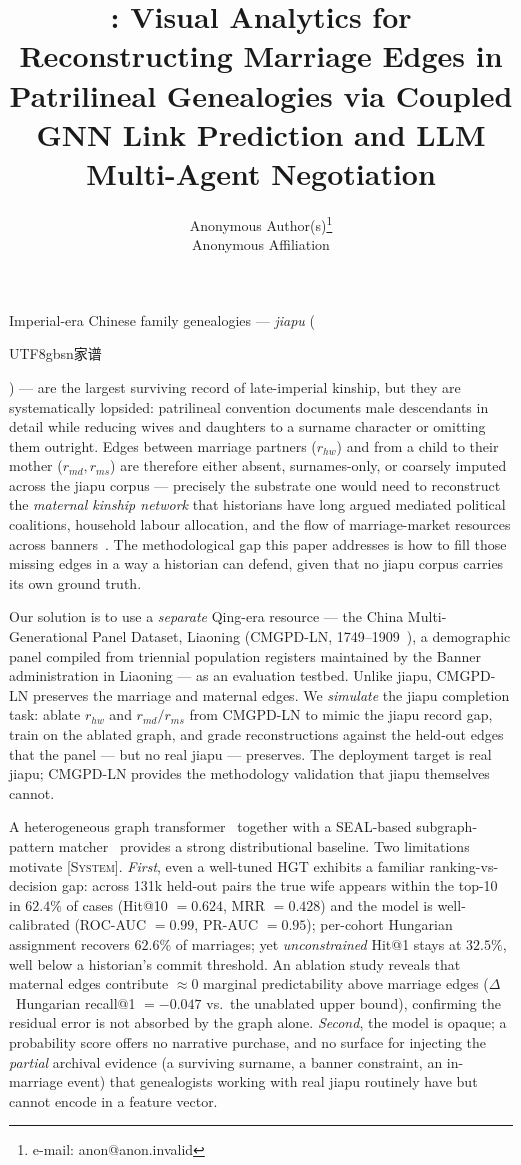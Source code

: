 \documentclass[review]{vgtc}                  %
\title{\system: Visual Analytics for Reconstructing Marriage Edges in
Patrilineal Genealogies via Coupled GNN Link Prediction and LLM
Multi-Agent Negotiation}
\author{Anonymous Author(s)\thanks{e-mail: anon@anon.invalid}\\
        \scriptsize Anonymous Affiliation}
\newcommand{\system}{\textsc{[System]}\xspace}
\begin{document}
\maketitle

Imperial-era Chinese family genealogies --- \emph{jiapu}
(\begin{CJK*}{UTF8}{gbsn}家谱\end{CJK*}) --- are the largest surviving
record of late-imperial kinship, but they are systematically lopsided:
patrilineal convention documents male descendants in detail while
reducing wives and daughters to a surname character or omitting them
outright. Edges between marriage partners ($r_{hw}$) and from a child
to their mother ($r_{md}, r_{ms}$) are therefore either absent,
surnames-only, or coarsely imputed across the jiapu corpus --- precisely
the substrate one would need to reconstruct the \emph{maternal kinship
network} that historians have long argued mediated political coalitions,
household labour allocation, and the flow of marriage-market resources
across banners~\cite{wang2007muxia, mann2002precious}.
The methodological gap this paper addresses is how to fill those
missing edges in a way a historian can defend, given that no jiapu
corpus carries its own ground truth.

Our solution is to use a \emph{separate} Qing-era resource --- the
China Multi-Generational Panel Dataset, Liaoning (CMGPD-LN,
1749--1909~\cite{cmgpd-ln-2010}), a demographic panel compiled from
triennial population registers maintained by the Banner administration
in Liaoning --- as an evaluation testbed. Unlike jiapu, CMGPD-LN
preserves the marriage and maternal edges. We \emph{simulate} the
jiapu completion task: ablate $r_{hw}$ and $r_{md}/r_{ms}$ from
CMGPD-LN to mimic the jiapu record gap, train on the ablated graph,
and grade reconstructions against the held-out edges that the panel
--- but no real jiapu --- preserves. The deployment target is real
jiapu; CMGPD-LN provides the methodology validation that jiapu
themselves cannot.

A heterogeneous graph transformer~\cite{hu2020hgt} together with a
SEAL-based subgraph-pattern matcher~\cite{zhang2018seal} provides a
strong distributional baseline. Two limitations motivate \system.
\emph{First}, even a well-tuned HGT exhibits a familiar
ranking-vs-decision gap: across 131k held-out pairs the true wife
appears within the top-10 in $62.4\%$ of cases
(Hit@10 $= 0.624$, MRR $= 0.428$) and the model is well-calibrated
(ROC-AUC $= 0.99$, PR-AUC $= 0.95$); per-cohort Hungarian assignment
recovers $62.6\%$ of marriages; yet \emph{unconstrained} Hit@1 stays
at $32.5\%$, well below a historian's commit threshold. An ablation
study reveals that maternal edges contribute $\approx\!0$ marginal
predictability above marriage edges
($\Delta$~Hungarian recall@1 $= -0.047$ vs.\ the unablated upper
bound), confirming the residual error is not absorbed by the graph
alone. \emph{Second}, the model is opaque; a probability
score offers no narrative purchase, and no surface for injecting the
\emph{partial} archival evidence (a surviving surname, a banner
constraint, an in-marriage event) that genealogists working with real
jiapu routinely have but cannot encode in a feature vector.
\end{document}
